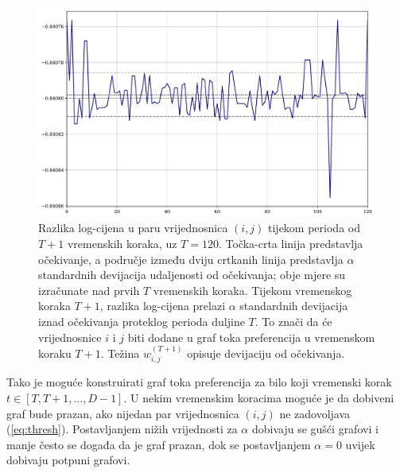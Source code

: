 \documentclass[lmodern, utf8, diplomski, numeric]{fer}
\newcommand{\q}{\left}
\newcommand{\w}{\right}
\begin{document}
  \begin{figure}[htb]
    \centering
    \includegraphics[width=0.9\columnwidth]{graphics/deviation-magnitude.pdf}
    \caption{
       Razlika log-cijena u paru vrijednosnica $(i,j)$ tijekom perioda od $T + 1$ vremenskih koraka, uz $T = 120$.
       Točka-crta linija predstavlja očekivanje, a područje između dviju crtkanih linija predstavlja $\alpha$ standardnih devijacija udaljenosti od očekivanja; obje mjere su izračunate nad prvih $T$ vremenskih koraka.
       Tijekom vremenskog koraka $T + 1$, razlika log-cijena prelazi $\alpha$ standardnih devijacija iznad očekivanja proteklog perioda duljine $T$.
       To znači da će vrijednosnice $i$ i $j$ biti dodane u graf toka preferencija u vremenskom koraku $T + 1$.
       Težina $w_{i,j}^{(T+1)}$ opisuje devijaciju od očekivanja.
    }
    \label{fig:devmag}
  \end{figure}
  
  Tako je moguće konstruirati graf toka preferencija za bilo koji vremenski korak $t \in \q[T, T + 1, \ldots, D-1\w]$.
  U nekim vremenskim koracima moguće je da dobiveni graf bude prazan, ako nijedan par vrijednosnica $(i,j)$ ne zadovoljava (\ref{eq:thresh}).
  Postavljanjem nižih vrijednosti za $\alpha$ dobivaju se gušći grafovi i manje često se događa da je graf prazan, dok se postavljanjem $\alpha = 0$ uvijek dobivaju potpuni grafovi.
\end{document}
